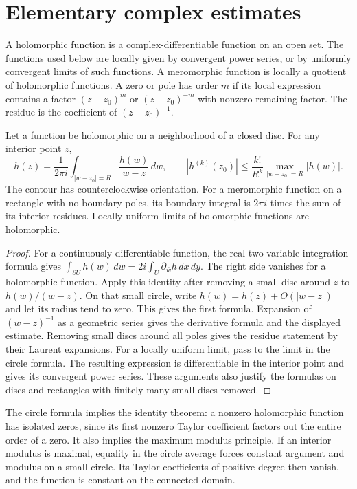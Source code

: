 \documentclass[11pt]{article}
\numberwithin{equation}{section}
\begin{document}
\section{Elementary complex estimates}
\label{sec:complex}

A holomorphic function is a complex-differentiable function on an open set.
The functions used below are locally given by convergent power series,
or by uniformly convergent limits of such functions.
A meromorphic function is locally a quotient of holomorphic functions.
A zero or pole has order $m$ if its local expression contains a factor
$(z-z_0)^m$ or $(z-z_0)^{-m}$ with nonzero remaining factor.
The residue is the coefficient of $(z-z_0)^{-1}$.

\begin{lemma}
\label{lem:cauchy}
Let a function be holomorphic on a neighborhood of a closed disc.
For any interior point $z$,
\[
 h(z)=\frac1{2\pi i}\int_{|w-z_0|=R}\frac{h(w)}{w-z}\,dw,
 \qquad
 |h^{(k)}(z_0)|\leq \frac{k!}{R^k}\max_{|w-z_0|=R}|h(w)|.
\]
The contour has counterclockwise orientation.
For a meromorphic function on a rectangle with no boundary poles, its
boundary integral is $2\pi i$ times the sum of its interior residues.
Locally uniform limits of holomorphic functions are holomorphic.
\end{lemma}

\begin{proof}
For a continuously differentiable function, the real two-variable
integration formula gives
$\int_{\partial U}h(w)\,dw=2i\int_U\partial_{\bar w}h\,dx\,dy$.
The right side vanishes for a holomorphic function.
Apply this identity after removing a small disc around $z$ to
$h(w)/(w-z)$.  On that small circle, write
$h(w)=h(z)+O(|w-z|)$ and let its radius tend to zero.
This gives the first formula.
Expansion of $(w-z)^{-1}$ as a geometric series gives the derivative formula
and the displayed estimate.  Removing small discs around all poles gives
the residue statement by their Laurent expansions.
For a locally uniform limit, pass to the limit in the circle formula.
The resulting expression is differentiable in the interior point and gives
its convergent power series.  These arguments also justify the formulas
on discs and rectangles with finitely many small discs removed.
\end{proof}

The circle formula implies the identity theorem: a nonzero holomorphic
function has isolated zeros, since its first nonzero Taylor coefficient
factors out the entire order of a zero.  It also implies the maximum
modulus principle.  If an interior modulus is maximal, equality in the
circle average forces constant argument and modulus on a small circle.
Its Taylor coefficients of positive degree then vanish, and the function
is constant on the connected domain.
\end{document}
